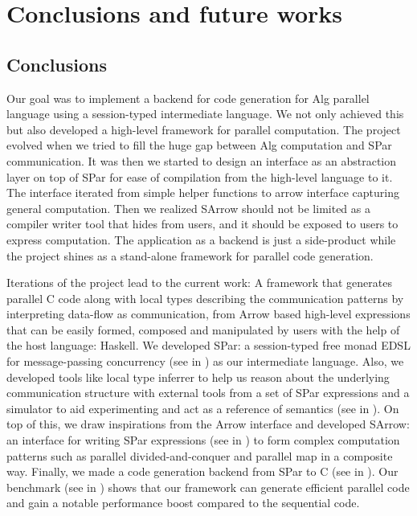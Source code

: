 \chapter{Conclusions and future works}
\section{Conclusions}

Our goal was to implement a backend for code generation for Alg parallel language using a session-typed intermediate language. We not only achieved this but also developed a high-level framework for parallel computation. The project evolved when we tried to fill the huge gap between Alg computation and SPar communication. It was then we started to design an interface as an abstraction layer on top of SPar for ease of compilation from the high-level language to it. The interface iterated from simple helper functions to arrow interface capturing general computation. Then we realized SArrow should not be limited as a compiler writer tool that hides from users, and it should be exposed to users to express computation. The application as a backend is just a side-product while the project shines as a stand-alone framework for parallel code generation.

Iterations of the project lead to the current work: A framework that generates parallel C code along with local types describing the communication patterns by interpreting data-flow as communication, from Arrow based high-level expressions that can be easily formed, composed and manipulated by users with the help of the host language: Haskell. We developed SPar: a session-typed free monad EDSL for message-passing concurrency (see in ) as our intermediate language. Also, we developed tools like local type inferrer to help us reason about the underlying communication structure with external tools from a set of SPar expressions and a simulator to aid experimenting and act as a reference of semantics (see in ). On top of this, we draw inspirations from the Arrow interface and developed SArrow: an interface for writing SPar expressions (see in ) to form complex computation patterns such as parallel divided-and-conquer and parallel map in a composite way. Finally, we made a code generation backend from SPar to C (see in ). Our benchmark (see in ) shows that our framework can generate efficient parallel code and gain a notable performance boost compared to the sequential code.

